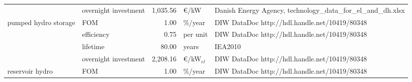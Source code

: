 \begin{longtable}{p{4cm}p{4cm}rp{3cm}p{10cm}}
                      & overnight investment &     1,035.56 &                      \euro/kW &                                                                                                                                                                                                                                                                        Danish Energy Agency, technology\_data\_for\_el\_and\_dh.xlsx \\
pumped hydro storage & FOM &         1.00 &                       \%/year &                                                                                                                                                                                                                                                                                        DIW DataDoc http://hdl.handle.net/10419/80348 \\
                      & efficiency &         0.75 &                      per unit &                                                                                                                                                                                                                                                                                        DIW DataDoc http://hdl.handle.net/10419/80348 \\
                      & lifetime &        80.00 &                         years &                                                                                                                                                                                                                                                                                                                              IEA2010 \\
                      & overnight investment &     2,208.16 &               \euro/kW$_{el}$ &                                                                                                                                                                                                                                                                                        DIW DataDoc http://hdl.handle.net/10419/80348 \\
reservoir hydro & FOM &         1.00 &                       \%/year &                                                                                                                                                                                                                                                                                        DIW DataDoc http://hdl.handle.net/10419/80348 \\

\end{longtable}

